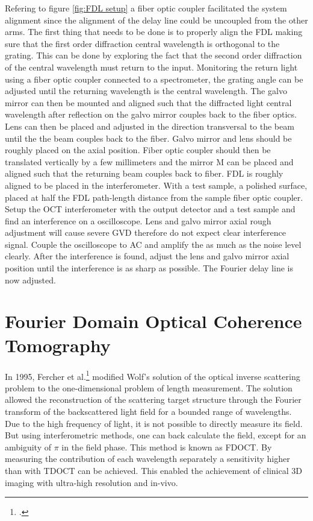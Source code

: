 \documentclass[12pt,twoside,english]{book}
\renewcommand{\~}{\perispomeni}%
\numberwithin{equation}{section}
\numberwithin{figure}{section}
\begin{document}
Refering to figure \ref{fig:FDL setup} a fiber optic coupler facilitated the system alignment since the alignment of the delay line could be uncoupled from the other arms. The first thing that needs to be done is to properly align the \gls{FDL} making sure that the first order diffraction central wavelength is orthogonal to the grating. This can be done by exploring the fact that the second order diffraction of the central wavelength must return to the input. Monitoring the return light using a fiber optic coupler connected to a spectrometer, the grating angle can be adjusted until the returning wavelength is the central wavelength. The galvo mirror can then be mounted and aligned such that the diffracted light central wavelength after reflection on the galvo mirror couples back to the fiber optics. Lens can then be placed and adjusted in the direction transversal to the beam until the the beam couples back to the fiber. Galvo mirror and lens should be roughly placed on the axial position. Fiber optic coupler should then be translated vertically by a few millimeters and the mirror M can be placed and aligned such that the returning beam couples back to fiber. FDL is roughly aligned to be placed in the interferometer. With a test sample, a polished surface, placed at half the FDL path-length distance from the sample fiber optic coupler. Setup the OCT interferometer with the output detector and a test sample and find an interference on a oscilloscope. Lens and galvo mirror axial rough adjustment will cause severe \gls{GVD} therefore do not expect clear interference signal. Couple the oscilloscope to AC and amplify the as much as the noise level clearly. After the interference is found, adjust the lens and galvo mirror axial position until the interference is as sharp as possible. The Fourier delay line is now adjusted.


\chapter[Fourier Domain OCT]{Fourier Domain Optical Coherence Tomography}
\label{chapter:FDOCT}
In 1995, Fercher et al.\footcite{Fercher:1995p1683} modified Wolf's solution of the optical inverse scattering problem to the one-dimensional problem of length measurement. The solution allowed the reconstruction of the scattering target structure through the Fourier transform of the backscattered light field for a bounded range of wavelengths. Due to the high frequency of light, it is not possible to directly measure its field. But using interferometric methods, one can back calculate the field, except for an ambiguity of $\pi$ in the field phase. This method is known as \gls{FDOCT}. By measuring the contribution of each wavelength separately a sensitivity higher than with \gls{TDOCT} can be achieved. This enabled the achievement of clinical 3D imaging with ultra-high resolution and in-vivo.
\end{document}
